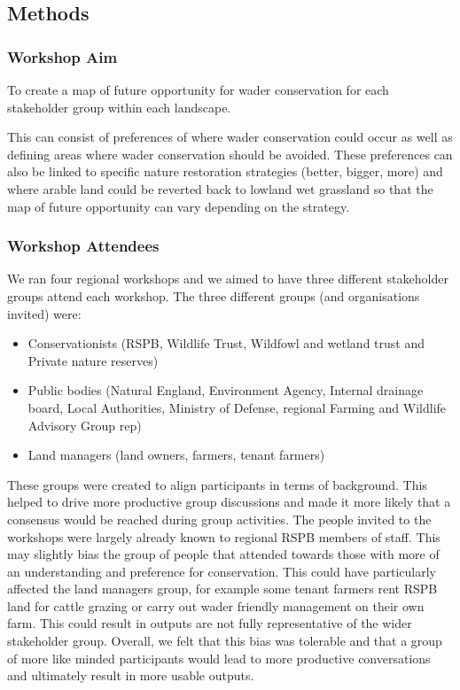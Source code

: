 \documentclass[
  12pt,
  letterpaper,
  DIV=11,
  numbers=noendperiod]{scrartcl}
\providecommand{\tightlist}{%
  \setlength{\itemsep}{0pt}\setlength{\parskip}{0pt}}\usepackage{longtable,booktabs,array}
\begin{document}
\subsection{Methods}\label{methods}

\subsubsection{Workshop Aim}\label{workshop-aim}

To create a map of future opportunity for wader conservation for each
stakeholder group within each landscape.

This can consist of preferences of where wader conservation could occur
as well as defining areas where wader conservation should be avoided.
These preferences can also be linked to specific nature restoration
strategies (better, bigger, more) and where arable land could be
reverted back to lowland wet grassland so that the map of future
opportunity can vary depending on the strategy.

\subsubsection{Workshop Attendees}\label{workshop-attendees}

We ran four regional workshops and we aimed to have three different
stakeholder groups attend each workshop. The three different groups (and
organisations invited) were:

\begin{itemize}
\tightlist
\item
  Conservationists (RSPB, Wildlife Trust, Wildfowl and wetland trust and
  Private nature reserves)
\item
  Public bodies (Natural England, Environment Agency, Internal drainage
  board, Local Authorities, Ministry of Defense, regional Farming and
  Wildlife Advisory Group rep)
\item
  Land managers (land owners, farmers, tenant farmers)
\end{itemize}

These groups were created to align participants in terms of background.
This helped to drive more productive group discussions and made it more
likely that a consensus would be reached during group activities. The
people invited to the workshops were largely already known to regional
RSPB members of staff. This may slightly bias the group of people that
attended towards those with more of an understanding and preference for
conservation. This could have particularly affected the land managers
group, for example some tenant farmers rent RSPB land for cattle grazing
or carry out wader friendly management on their own farm. This could
result in outputs are not fully representative of the wider stakeholder
group. Overall, we felt that this bias was tolerable and that a group of
more like minded participants would lead to more productive
conversations and ultimately result in more usable outputs.
\end{document}

